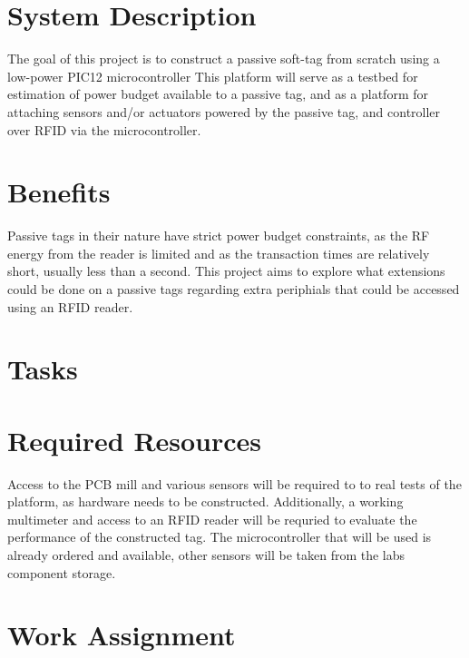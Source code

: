 \section{System Description}
The goal of this project is to construct a passive soft-tag from scratch using a low-power PIC12 microcontroller
This platform will serve as a testbed for estimation of power budget available to a passive tag,
and as a platform for attaching sensors and/or actuators powered by the passive tag, and controller
over RFID via the microcontroller.

\section{Benefits}
Passive tags in their nature have strict power budget constraints, as the RF energy from the reader is limited
and as the transaction times are relatively short, usually less than a second. This project aims to explore
what extensions could be done on a passive tags regarding extra periphials that could be accessed using an RFID reader.


\section{Tasks}


\section{Required Resources}

Access to the PCB mill and various sensors will be required to to real tests of the platform, as hardware needs to be constructed.
Additionally, a working multimeter and access to an RFID reader will be requried to evaluate the performance of the constructed tag.
The microcontroller that will be used is already ordered and available, other sensors will be taken from the labs component storage.


\section{Work Assignment}
